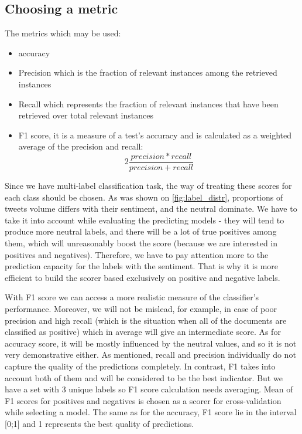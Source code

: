 \documentclass[12pt,a4paper]{article}
\begin{document}
\newpage

\subsection{Choosing a metric}
The metrics which may be used:
\begin{itemize}
\item accuracy
\item Precision which is the fraction of relevant instances among the retrieved instances
\item Recall which represents the fraction of relevant instances that have been retrieved over total relevant instances 
\item F1 score, it is a measure of a test's accuracy and is calculated as a weighted average of the precision and recall: \[ 2  \frac{precision * recall}{precision + recall}\]
\end{itemize}

Since we have multi-label classification task, the way of treating these scores for each class should be chosen. As was shown on \ref{fig:label_distr}, proportions of tweets volume differs with their sentiment, and the neutral dominate. We have to take it into account while evaluating the predicting models - they will tend to produce more neutral labels, and there will be a lot of true positives among them, which will unreasonably boost the score (because we are interested in positives and negatives). Therefore, we have to pay attention more to the prediction capacity for the labels with the sentiment. That is why it is more efficient to build the scorer based exclusively on positive and negative labels.

With F1 score we can access a more realistic measure of the classifier's performance. Moreover, we will not be mislead, for example, in case of poor precision and high recall (which is the situation when all of the documents are classified as positive) which in average will give an intermediate score. As for accuracy score, it will be mostly influenced by the neutral values, and so it is not very demonstrative either.
As mentioned, recall and precision individually do not capture the quality of the predictions completely. In contrast, F1 takes into account both of them and will be considered to be the best indicator. But we have a set with 3 unique labels so F1 score calculation needs averaging. Mean of F1 scores for positives and negatives is chosen as a scorer for  cross-validation while selecting a model. The same as for the accuracy, F1 score lie in the interval [0;1] and 1 represents the best quality of predictions. 
\end{document}
